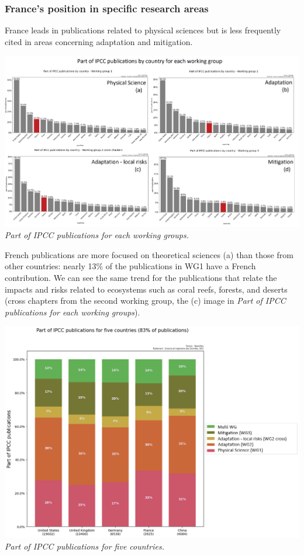\documentclass[
]{article}
\begin{document}
\hypertarget{frances-position-in-specific-research-areas}{%
\subsubsection{France's position in specific research
areas}\label{frances-position-in-specific-research-areas}}

France leads in publications related to physical sciences but is less
frequently cited in areas concerning adaptation and mitigation.

\includegraphics{./images/teds_ipcc_wg_ens_part.png} \emph{Part of IPCC
publications for each working groups.}

French publications are more focused on theoretical sciences (a) than
those from other countries: nearly 13\% of the publications in WG1 have
a French contribution. We can see the same trend for the publications
that relate the impacts and risks related to ecosystems such as coral
reefs, forests, and deserts (cross chapters from the second working
group, the (c) image in \emph{Part of IPCC publications for each working
groups}).

\includegraphics{./images/teds_ipcc_5countries_interfaces.png}
\emph{Part of IPCC publications for five countries.}
\end{document}

